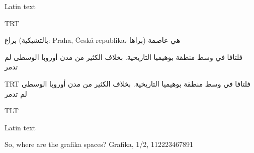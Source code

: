 \documentclass{article}
\begin{document}
\pokus

Latin text 

\pardir TRT

براغ (بالتشيكية: Praha, Česká republika، براها) هي عاصمة 


فلتافا في وسط منطقة بوهيميا التاريخية. بخلاف الكثير من مدن أوروبا الوسطى لم تدمر

{\textdir TRT
فلتافا في وسط منطقة بوهيميا التاريخية. بخلاف الكثير من مدن أوروبا الوسطى لم تدمر
}

\pardir TLT

\libertine
Latin text

So, where are the \bold grafika spaces\libertine? Grafika, 1/2, 112223467891
\end{document}
